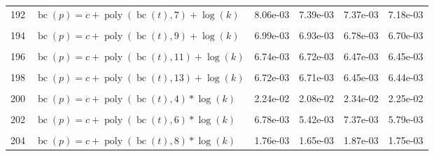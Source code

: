 \documentclass[12pt,a4paper]{article}
\DeclareMathOperator{\bc}{bc}
\DeclareMathOperator{\poly}{poly}
\begin{document}
\begin{longtable}[t]{ll>{\raggedleft\arraybackslash}p{2cm}>{\raggedleft\arraybackslash}p{2cm}>{\raggedleft\arraybackslash}p{2cm}>{\raggedleft\arraybackslash}p{2cm}}
192 & $\bc(p) = c + \poly\left( \bc(t), 7 \right) + \log(k)$ & 8.06e-03 & 7.39e-03 & 7.37e-03 & 7.18e-03\\
\cellcolor{gray!6}{193} & \cellcolor{gray!6}{$\bc(p) = c + \poly\left( \bc(t), 8 \right) + \log(k)$} & \cellcolor{gray!6}{6.92e-03} & \cellcolor{gray!6}{6.89e-03} & \cellcolor{gray!6}{6.68e-03} & \cellcolor{gray!6}{6.64e-03}\\
194 & $\bc(p) = c + \poly\left( \bc(t), 9 \right) + \log(k)$ & 6.99e-03 & 6.93e-03 & 6.78e-03 & 6.70e-03\\
\cellcolor{gray!6}{195} & \cellcolor{gray!6}{$\bc(p) = c + \poly\left( \bc(t), 10 \right) + \log(k)$} & \cellcolor{gray!6}{6.73e-03} & \cellcolor{gray!6}{6.72e-03} & \cellcolor{gray!6}{6.47e-03} & \cellcolor{gray!6}{6.45e-03}\\
196 & $\bc(p) = c + \poly\left( \bc(t), 11 \right) + \log(k)$ & 6.74e-03 & 6.72e-03 & 6.47e-03 & 6.45e-03\\
\cellcolor{gray!6}{197} & \cellcolor{gray!6}{$\bc(p) = c + \poly\left( \bc(t), 12 \right) + \log(k)$} & \cellcolor{gray!6}{6.72e-03} & \cellcolor{gray!6}{6.71e-03} & \cellcolor{gray!6}{6.45e-03} & \cellcolor{gray!6}{6.44e-03}\\
198 & $\bc(p) = c + \poly\left( \bc(t), 13 \right) + \log(k)$ & 6.72e-03 & 6.71e-03 & 6.45e-03 & 6.44e-03\\
\cellcolor{gray!6}{199} & \cellcolor{gray!6}{$\bc(p) = c + \poly\left( \bc(t), 3 \right) * \log(k)$} & \cellcolor{gray!6}{5.40e-02} & \cellcolor{gray!6}{1.71e-02} & \cellcolor{gray!6}{1.91e-02} & \cellcolor{gray!6}{1.78e-02}\\
200 & $\bc(p) = c + \poly\left( \bc(t), 4 \right) * \log(k)$ & 2.24e-02 & 2.08e-02 & 2.34e-02 & 2.25e-02\\
\cellcolor{gray!6}{201} & \cellcolor{gray!6}{$\bc(p) = c + \poly\left( \bc(t), 5 \right) * \log(k)$} & \cellcolor{gray!6}{8.83e-03} & \cellcolor{gray!6}{8.82e-03} & \cellcolor{gray!6}{8.44e-03} & \cellcolor{gray!6}{8.44e-03}\\
202 & $\bc(p) = c + \poly\left( \bc(t), 6 \right) * \log(k)$ & 6.78e-03 & 5.42e-03 & 7.37e-03 & 5.79e-03\\
\cellcolor{gray!6}{203} & \cellcolor{gray!6}{$\bc(p) = c + \poly\left( \bc(t), 7 \right) * \log(k)$} & \cellcolor{gray!6}{4.46e-03} & \cellcolor{gray!6}{3.00e-03} & \cellcolor{gray!6}{3.50e-03} & \cellcolor{gray!6}{3.11e-03}\\
204 & $\bc(p) = c + \poly\left( \bc(t), 8 \right) * \log(k)$ & 1.76e-03 & 1.65e-03 & 1.87e-03 & 1.75e-03\\

\end{longtable}
\end{document}
